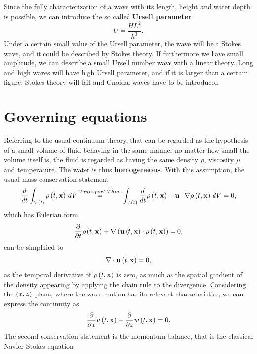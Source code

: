 Since the fully characterization of a wave with its length, height and water depth is possible, we can introduce the so called \textbf{Ursell parameter}
\begin{equation}
U=\dfrac{HL^{2}}{h^{3}}.
\end{equation}
Under a certain small value of the Ursell parameter, the wave will be a Stokes wave, and it could be described by Stokes theory. If furthermore we have small amplitude, we can describe a small Ursell number wave with a linear theory. Long and high waves will have high Ursell parameter, and if it is larger than a certain figure, Stokes theory will fail and Cnoidal waves have to be introduced.
\section{Governing equations}
Referring to the usual continuum theory, that can be regarded as the hypothesis of a small volume of fluid behaving in the same manner no matter how small the volume itself is, the fluid is regarded as having the same density $\rho$, viscosity $\mu$ and temperature. The water is thus \textbf{homogeneous}. With this assumption, the usual mass conservation statement
\begin{equation}
\dfrac{d}{dt}\int_{V\left( t \right)}\rho\left( t,\mathbf{x} \right)\,dV\overset{Transport\text{  }Thm.}{=}\int_{V\left( t \right)}
\dfrac{d}{dt}\rho\left( t,\mathbf{x} \right)+\mathbf{u}\cdot\nabla\rho\left( t,\mathbf{x} \right)\,dV =0,
\end{equation}
which has Eulerian form
\begin{equation}
\dfrac{\partial}{\partial t}\rho\left( t,\mathbf{x} \right)+\nabla\left( \mathbf{u}\left( t,\mathbf{x} \right)\cdot\rho\left( t,\mathbf{x} \right) \right)=0,
\end{equation}
can be simplified to 
\begin{equation}
\nabla\cdot\mathbf{u}\left( t,\mathbf{x} \right)=0,
\end{equation}
as the temporal derivative of $\rho\left( t,\mathbf{x} \right)$ is zero, as much as the spatial gradient of the density appearing by applying the chain rule to the divergence. Considering the $\left( x,z \right)$ plane, where the wave motion has its relevant characteristics, we can express the continuity as 
\begin{equation}
\dfrac{\partial}{\partial x}u\left( t,\mathbf{x} \right)+\dfrac{\partial}{\partial z}w\left( t,\mathbf{x} \right)=0.
\end{equation}
The second conservation statement is the momentum balance, that is the classical Navier-Stokes equation
